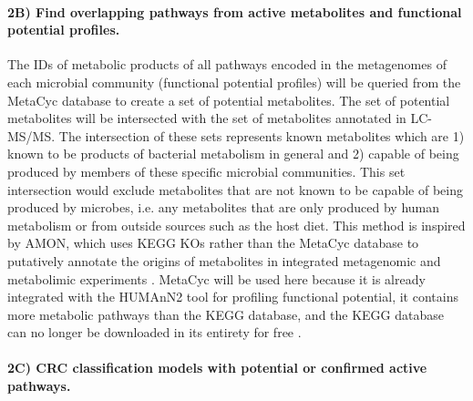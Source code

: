 \documentclass[11pt]{article}
\begin{document}
\paragraph{2B) Find overlapping pathways from active metabolites and functional potential profiles.}

The IDs of metabolic products of all pathways encoded in the metagenomes of each microbial community (functional potential profiles) will be queried from the MetaCyc database to create a set of potential metabolites.
The set of potential metabolites will be intersected with the set of metabolites annotated in LC-MS/MS.
The intersection of these sets represents known metabolites which are 1) known to be products of bacterial metabolism in general and 2) capable of being produced by members of these specific microbial communities.
This set intersection would exclude metabolites that are not known to be capable of being produced by microbes, i.e. any metabolites that are only produced by human metabolism or from outside sources such as the host diet.
This method is inspired by AMON, which uses KEGG KOs rather than the MetaCyc database to putatively annotate the origins of metabolites in integrated metagenomic and metabolimic experiments \cite{shaffer_amon_2019}.
MetaCyc will be used here because it is already integrated with the HUMAnN2 tool for profiling functional potential,
it contains more metabolic pathways than the KEGG database,
and the KEGG database can no longer be downloaded in its entirety for free \cite{caspi_metacyc_2020}.

\paragraph{2C) CRC classification models with potential or confirmed active pathways.}
\end{document}
